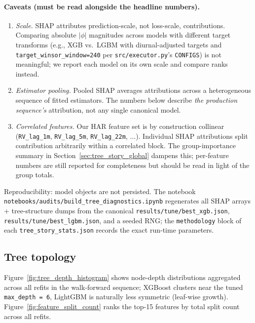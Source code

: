 \paragraph{Caveats (must be read alongside the headline numbers).}
\begin{enumerate}
    \item \emph{Scale.} SHAP attributes prediction-scale, not
        loss-scale, contributions. Comparing absolute $|\phi|$
        magnitudes across models with different target transforms
        (e.g., XGB vs.\ LGBM with diurnal-adjusted targets and
        \texttt{target\_winsor\_window=240} per
        \texttt{src/executor.py}'s \texttt{CONFIGS}) is not
        meaningful; we report each model on its own scale and
        compare ranks instead.
    \item \emph{Estimator pooling.} Pooled SHAP averages
        attributions across a heterogeneous sequence of fitted
        estimators. The numbers below describe \emph{the production
        sequence's} attribution, not any single canonical model.
    \item \emph{Correlated features.} Our HAR feature set is by
        construction collinear (\texttt{RV\_lag\_1m},
        \texttt{RV\_lag\_5m}, \texttt{RV\_lag\_22m}, $\dots$).
        Individual SHAP attributions split contribution arbitrarily
        within a correlated block. The group-importance summary in
        Section~\ref{sec:tree_story_global} dampens this; per-feature
        numbers are still reported for completeness but should be
        read in light of the group totals.
\end{enumerate}

Reproducibility: model objects are not persisted. The notebook
\texttt{notebooks/audits/build\_tree\_diagnostics.ipynb} regenerates
all SHAP arrays + tree-structure dumps from the canonical
\texttt{results/tune/best\_xgb.json},
\texttt{results/tune/best\_lgbm.json}, and a seeded RNG; the
\texttt{methodology} block of each
\texttt{tree\_story\_stats.json} records the exact run-time
parameters.

\subsection{Tree topology}
\label{sec:tree_story_topology}

Figure~\ref{fig:tree_depth_histogram} shows node-depth distributions
aggregated across all refits in the walk-forward sequence; XGBoost
clusters near the tuned \texttt{max\_depth = 6}, LightGBM is
naturally less symmetric (leaf-wise growth).
Figure~\ref{fig:feature_split_count} ranks the top-15 features by
total split count across all refits.

